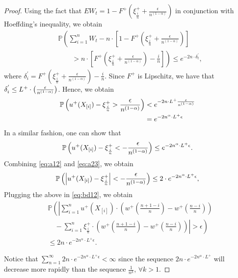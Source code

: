 \begin{proof}
Using the fact that 
$E W_t = 1-F^{+}\left(\xi^+_{\frac{i}{n}} +\frac{\epsilon}{n^{(1-\alpha)}}\right)$ in conjunction with Hoeffding's inequality, we obtain
\begin{align*}
&\mathbb{P} \left( \sum _{i=1}^{n} W_t - n \cdot \left[1-F^{+}\left(\xi^+_{\frac{i}{n}} +\frac{\epsilon}{n^{(1-\alpha) }  } \right) \right] \right.\\
&\left.\qquad> n
\cdot \left[F^{+}\left(\xi^+_{\frac{i}{n}} +\frac{\epsilon}{n^{(1-\alpha)} } \right) - \frac{i}{n}\right]\right) \le e^{-2n\cdot
\delta^{'}_t},
\end{align*}
where $\delta^{'}_i = F^{+}\left(\xi^+_{\frac{i}{n}} +\frac{\epsilon} {n^{(1-\alpha)} }\right) - \frac{i}{n}$. Since 
$F^{+}$ is Lipschitz, we have that $ \delta^{'}_i \leq L^{+} \cdot \left(\frac{\epsilon}{n^{(1-\alpha)}}\right)$.
Hence, we obtain
\begin{align}
\mathbb{P}\left(  u^+(X_{[i]}) - \xi^+_{\frac{i}{n}} > \frac {\epsilon}{n^{(1-\alpha)}} \right) &< e^{-2n\cdot L^{+}
\frac{\epsilon}{n^{(1-\alpha)}} } \nonumber\\
&= e^{-2n^\alpha \cdot L ^{+} \epsilon}
\label{eq:a12}
\end{align}
In a  similar fashion, one can show that 
\begin{align}
\mathbb{P}\left(  u^+(X_{[i]}) -\xi^+_{\frac{i}{n}} < -\frac {\epsilon} {n^{(1-\alpha)}} \right) \leq e^{-2n^\alpha \cdot L^{+}  \epsilon}.
\label{eq:a23}
\end{align}
Combining \eqref{eq:a12} and \eqref{eq:a23},  we obtain 
\begin{align*}
\mathbb{P}\left(  \left| u^+(X_{[i]}) -\xi^+_{\frac{i}{n}} \right| < -\frac {\epsilon} {n^{(1-\alpha)}} \right) \leq 2\cdot
e^{-2n^\alpha \cdot L^{+} \epsilon} , 
\end{align*}
Plugging the above in \eqref{eq:bd12}, we obtain
\begin{align}
&
\mathbb{P} \left( \left| \sum_{i=1}^{n} u^+\left(X_{[i]}\right) \cdot \left(w^+\left(\frac{n+1-i}{n} \right)  - w^+\left(\frac{n-i}{n} \right) \right) \right.\right. \nonumber\\
&\left.\left.\quad -
\sum_{i=1}^{n} \xi^+_{\frac{i}{n}} \cdot \left(w^+\left(\frac{n+1-i}{n} \right)  - w^+\left(\frac{n-i}{n} \right) \right) \right| >
\epsilon\right) \nonumber\\
&\leq 2n\cdot e^{-2n^\alpha \cdot L^{+}\epsilon}.\label{eq:holder-sample-complexity-extract}
\end{align}

Notice that $\sum_{n=1}^{\infty}  2n \cdot e^{-2n^{\alpha}\cdot L^{+} \epsilon}< \infty$ since the sequence 
$2n \cdot e^{-2n^{\alpha}\cdot L^{+}}$ will decrease more rapidly than the sequence
$\frac{1}{n^k}$, $\forall k>1$.


\end{proof}
